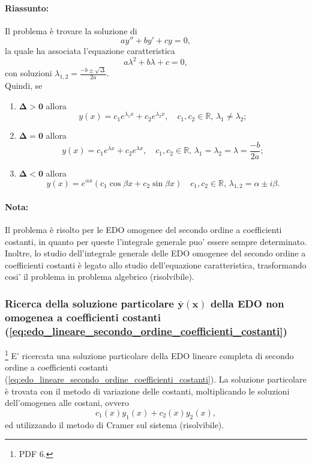 \paragraph{Riassunto:} Il problema è trovare la soluzione di
\begin{equation*}
	ay'' + b y' + cy = 0,
\end{equation*}
la quale ha associata l'equazione caratteristica
\begin{equation*}
	a\lambda^2 + b\lambda + c = 0,
\end{equation*}
con soluzioni $\lambda_{1,2}=\frac{-b\pm\sqrt{\Delta}}{2a}$.\\
Quindi, se
\begin{enumerate}
	\item $\boldsymbol{\Delta>0}$ allora
	\begin{equation*}
		y(x) = c_1 e^{\lambda_1x} + c_2e^{\lambda_2 x},\quad c_1,c_2\in\mathbb{R},\, \lambda_1 \neq \lambda_2;
	\end{equation*}
	\item $\boldsymbol{\Delta = 0}$ allora
	\begin{equation*}
		y(x) = c_1 e^{\lambda x} + c_2e^{\lambda x},\quad c_1,c_2\in\mathbb{R},\, \lambda_1 = \lambda_2=\lambda=\frac{-b}{2a};
	\end{equation*}
	\item $\boldsymbol{\Delta<0}$ allora
	\begin{equation*}
		y(x) = e^{\alpha x}(c_1\cos\beta x + c_2 \sin\beta x)\quad c_1,c_2\in\mathbb{R},\, \lambda_{1,2} = \alpha\pm i\beta.
	\end{equation*}
\end{enumerate}

\paragraph{Nota:} Il problema è risolto per le EDO omogenee del secondo ordine a coefficienti costanti, in quanto per queste l'integrale generale puo' essere sempre determinato. Inoltre, lo studio dell'integrale generale delle EDO omogenee del secondo ordine a coefficienti costanti è legato allo studio dell'equazione caratteristica, trasformando cosi' il problema in problema algebrico (risolvibile).

\subsubsection{Ricerca della soluzione particolare \texorpdfstring{$\boldsymbol{\bar y(x)}$}{y(x)} della EDO non omogenea a coefficienti costanti (\ref{eq:edo_lineare_secondo_ordine_coefficienti_costanti})}
\footnote{PDF 6.}
E' ricercata una soluzione particolare della EDO lineare completa di secondo ordine a coefficienti costanti (\ref{eq:edo_lineare_secondo_ordine_coefficienti_costanti}). La soluzione particolare è trovata con il metodo di variazione delle costanti, moltiplicando le soluzioni dell'omogenea alle costani, ovvero
\begin{equation*}
	c_1(x)y_1(x) + c_2(x)y_2(x),
\end{equation*}
ed utilizzando il metodo di Cramer sul sistema (risolvibile).

